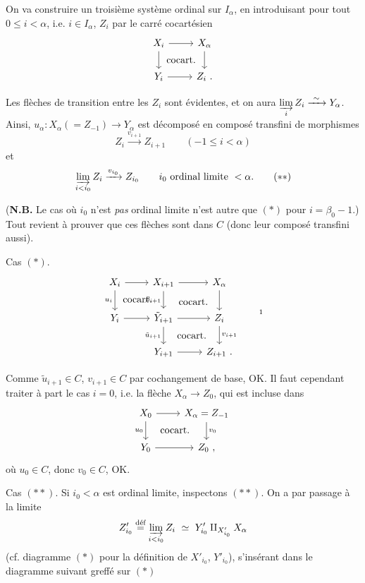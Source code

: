\documentclass[11pt]{article}
\newcommand{\printedpage}[1]{\marginpar{\footnotesize p.~#1}}
\newcommand{\msp}[1]{\marginpar{\footnotesize [#1]}}
\begin{document}
On va construire un troisième système ordinal sur $I_\alpha$, en introduisant pour tout $0 \leq i < \alpha$, i.e. $i \in I_\alpha$, $Z_i$ par le carré cocartésien
\printedpage{3}
\[
\begin{tikzcd}
X_i \arrow[r] \arrow[d] \arrow[dr, phantom, "\text{cocart.}"] & X_\alpha \arrow[d] \\
Y_i \arrow[r] & Z_i\ .
\end{tikzcd}
\]

Les flèches de transition entre les $Z_i$ sont évidentes, et on aura $\varinjlim\limits_{i} Z_i \xrightarrow{\ \sim\ } Y_\alpha$. Ainsi, $u_\alpha : X_\alpha (= Z_{-1}) \longrightarrow Y_\alpha$ est décomposé en composé transfini de morphismes
\msp{page 6}
\[
Z_i \xrightarrow{v_{i+1}} Z_{i+1} \qquad (-1 \leq i < \alpha)
\tag*{$(*)$}
\]
et
\[
\varinjlim_{i<i_0} Z_i \xrightarrow{v_{i_0}} Z_{i_0} \qquad i_0 \text{ ordinal limite } < \alpha.
\tag*{$(**)$}
\]

(\textbf{N.B.} Le cas où $i_0$ n'est \textit{pas} ordinal limite n'est autre que $(*)$ pour $i = \beta_0 - 1$.) Tout revient à prouver que ces flèches sont dans $C$ (donc leur composé transfini aussi). %

Cas $(*)$.
\[
\begin{tikzcd}
X_i \arrow[r] \arrow[d, "u_i"'] \arrow[dr, phantom, "\text{cocart.}"] & X_{i+1} \arrow[r] \arrow[d, "\beta_{i+1}"'] \arrow[dr, phantom, "\text{cocart.}"] & X_\alpha \arrow[d] \\
Y_i \arrow[r] & \tilde{Y}_{i+1} \arrow[r] \arrow[d, "\tilde{u}_{i+1}"'] \arrow[dr, phantom, "\text{cocart.}"] & Z_i \arrow[d, "v_{i+1}"] \\
& Y_{i+1} \arrow[r] & Z_{i+1}\ .
\end{tikzcd}
\tag*{\footnotemark}
\]

Comme $\tilde{u}_{i+1} \in C$, $v_{i+1} \in C$ par cochangement de base, OK. Il faut cependant traiter à part le cas $i = 0$, i.e. la flèche $X_\alpha \longrightarrow Z_0$, qui est incluse dans
\[
\begin{tikzcd}
X_0 \arrow[r] \arrow[d, "u_0"'] \arrow[dr, phantom, "\text{cocart.}"] & X_\alpha = Z_{-1} \arrow[d, "v_0"] \\
Y_0 \arrow[r] & Z_0\ ,
\end{tikzcd}
\]
où $u_0 \in C$, donc $v_0 \in C$, OK.

Cas $(**)$. Si $i_0 < \alpha$ est ordinal limite, inspectons $(**)$. On a par passage à la limite
\[
Z'_{i_0} \overset{\text{déf}}{=} \varinjlim_{i<i_0} Z_i \ \simeq\ Y'_{i_0} \amalg_{X'_{i_0}} X_\alpha
\]
(cf. diagramme $(*)$ pour la définition de $X'_{i_0}$, $Y'_{i_0}$), s'insérant dans le diagramme suivant greffé sur $(*)$
\end{document}
